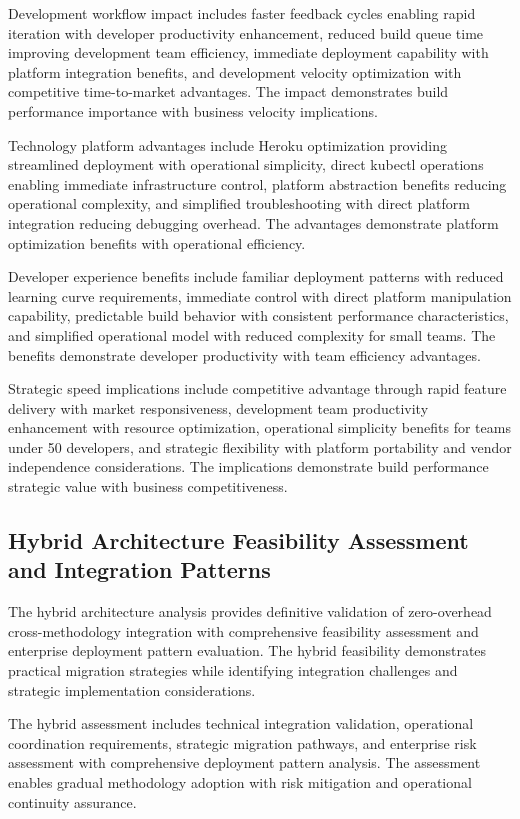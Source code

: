 Development workflow impact includes faster feedback cycles enabling rapid iteration with developer productivity enhancement, reduced build queue time improving development team efficiency, immediate deployment capability with platform integration benefits, and development velocity optimization with competitive time-to-market advantages. The impact demonstrates build performance importance with business velocity implications.

Technology platform advantages include Heroku optimization providing streamlined deployment with operational simplicity, direct kubectl operations enabling immediate infrastructure control, platform abstraction benefits reducing operational complexity, and simplified troubleshooting with direct platform integration reducing debugging overhead. The advantages demonstrate platform optimization benefits with operational efficiency.

Developer experience benefits include familiar deployment patterns with reduced learning curve requirements, immediate control with direct platform manipulation capability, predictable build behavior with consistent performance characteristics, and simplified operational model with reduced complexity for small teams. The benefits demonstrate developer productivity with team efficiency advantages.

Strategic speed implications include competitive advantage through rapid feature delivery with market responsiveness, development team productivity enhancement with resource optimization, operational simplicity benefits for teams under 50 developers, and strategic flexibility with platform portability and vendor independence considerations. The implications demonstrate build performance strategic value with business competitiveness.


\subsection{Hybrid Architecture Feasibility Assessment and Integration Patterns}
\label{subsec:hybrid_architecture}

The hybrid architecture analysis provides definitive validation of zero-overhead cross-methodology integration with comprehensive feasibility assessment and enterprise deployment pattern evaluation. The hybrid feasibility demonstrates practical migration strategies while identifying integration challenges and strategic implementation considerations.

The hybrid assessment includes technical integration validation, operational coordination requirements, strategic migration pathways, and enterprise risk assessment with comprehensive deployment pattern analysis. The assessment enables gradual methodology adoption with risk mitigation and operational continuity assurance.